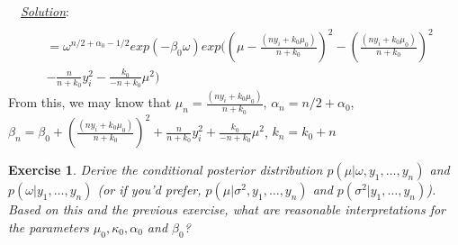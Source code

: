 \documentclass[twoside]{article}
\newcounter{lecnum}
\newtheorem{exercise}{Exercise}[lecnum]
\newenvironment{solution}{
  \begin{flushleft} \noindent ~~\underline{\emph{Solution}}: \rmfamily}{\end{flushleft}}
\begin{document}
\begin{solution}
\begin{equation}
\begin{split}
\\ &= \omega^{n/2+\alpha_{0}-1/2} exp(-\beta_0\omega) exp((\mu -\frac{(n y_i+ {k_0 \mu_0})}{n+ k_0})^2 -(\frac{({n}y_i+{k_0}\mu_0)}{n+ k_0})^2 \\ &-\frac{n}{n+k_0}y_i^2 -\frac{ k_0}{-{n+ k_0}}\mu^2 ) 
\end{split}
\end{equation}
From this, we may know that $\mu_n = \frac{(n y_i+ {k_0 \mu_0})}{n+ k_0}$, $\alpha_n = n/2+\alpha_{0}$, $\beta_n =\beta_0+(\frac{({n}y_i+{k_0}\mu_0)}{n+ k_0})^2 + \frac{n}{n+k_0}y_i^2 + \frac{ k_0}{-{n+ k_0}}\mu^2 $, $k_n = k_0 +n$
\end{solution}

\begin{exercise}
  Derive the conditional posterior distribution $p(\mu|\omega,y_1,\dots, y_n)$ and $p(\omega|y_1,\dots, y_n)$ (or if you'd prefer, $p(\mu|\sigma^2, y_1,\dots, y_n)$ and $p(\sigma^2|y_1,\dots, y_n)$). Based on this and the previous exercise, what are reasonable interpretations for the parameters $\mu_0,\kappa_0, \alpha_0$ and $\beta_0$?
\end{exercise}
\end{document}
